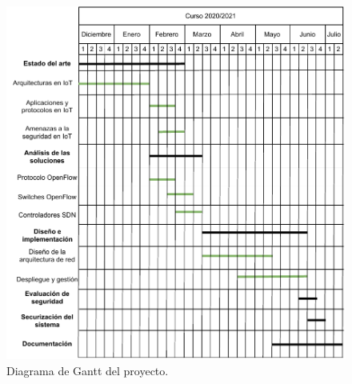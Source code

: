 \begin{figure}[t!]
    \centering
    \includegraphics[width=1\textwidth]{imagenes/cap2/gannt.pdf}
    \caption{Diagrama de Gantt del proyecto.}
    \label{fig:gantt}
\end{figure}
